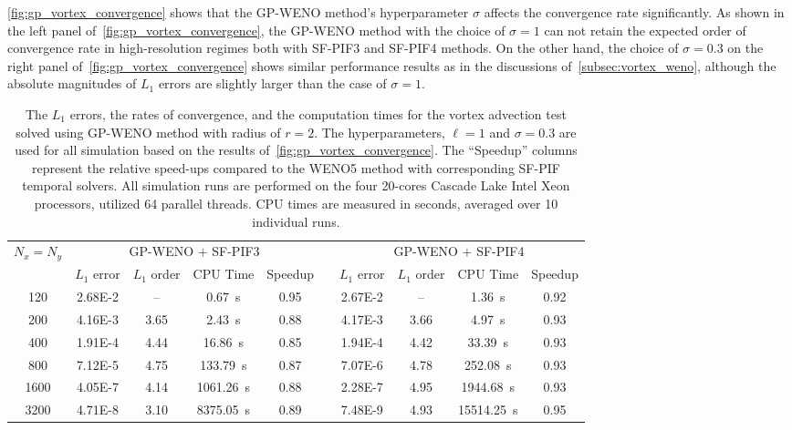 \cref{fig:gp_vortex_convergence} shows that the GP-WENO method's hyperparameter \( \sigma \)
affects the convergence rate significantly.
As shown in the left panel of~\cref{fig:gp_vortex_convergence},
the GP-WENO method with the choice of \( \sigma = 1 \) can not retain
the expected order of convergence rate
in high-resolution regimes
both with SF-PIF3 and SF-PIF4 methods.
On the other hand, the choice of \( \sigma = 0.3 \) on the right panel of~\cref{fig:gp_vortex_convergence}
shows similar performance results as in the discussions of~\cref{subsec:vortex_weno},
although the absolute magnitudes of \( L_{1} \) errors are slightly larger than
the case of \( \sigma = 1 \).

\begin{table}
    \centering
    \caption{The \( L_{1} \) errors, the rates of convergence,
        and the computation times for the vortex advection test
        solved using GP-WENO method with radius of \( r = 2 \).
        The hyperparameters, \( \ell = 1 \) and \( \sigma = 0.3 \)
        are used for all simulation based on the results of~\cref{fig:gp_vortex_convergence}.
        The ``Speedup'' columns represent the relative speed-ups
        compared to the WENO5 method with corresponding SF-PIF temporal solvers.
        All simulation runs are
        performed on the four 20-cores
        Cascade Lake Intel Xeon processors, utilized 64 parallel threads.
        CPU times are measured in seconds, averaged over 10 individual runs.
    }\label{table:vortex_gp2}
    \begin{adjustbox}{width=\textwidth}
        \begin{tabular}{@{}ccccclcccc@{}}
            \toprule
            \multirow{2}{*}{\( N_{x} = N_{y} \)} & \multicolumn{4}{c}{GP-WENO + SF-PIF3} &  & \multicolumn{4}{c}{GP-WENO + SF-PIF4} \\
            \cmidrule(lr){2-5} \cmidrule(l){7-10}
            & \(L_{1}\) error & \(L_{1}\) order & CPU Time & Speedup &  &
            \(L_{1}\) error & \(L_{1}\) order & CPU Time & Speedup \\ \midrule
            120  & \num{2.68E-2} & \--- & \SI{0.67}{\second}      & 0.95 &  & \num{2.67E-2} & \--- & \SI{1.36}{\second}     & 0.92 \\
            200  & \num{4.16E-3} & 3.65 & \SI{2.43}{\second}      & 0.88 &  & \num{4.17E-3} & 3.66 & \SI{4.97}{\second}     & 0.93 \\
            400  & \num{1.91E-4} & 4.44 & \SI{16.86}{\second}     & 0.85 &  & \num{1.94E-4} & 4.42 & \SI{33.39}{\second}    & 0.93 \\
            800  & \num{7.12E-5} & 4.75 & \SI{133.79}{\second}    & 0.87 &  & \num{7.07E-6} & 4.78 & \SI{252.08}{\second}   & 0.93 \\
            1600 & \num{4.05E-7} & 4.14 & \SI{1061.26}{\second}   & 0.88 &  & \num{2.28E-7} & 4.95 & \SI{1944.68}{\second}  & 0.93 \\
            3200 & \num{4.71E-8} & 3.10 & \SI{8375.05}{\second}   & 0.89 &  & \num{7.48E-9} & 4.93 & \SI{15514.25}{\second} & 0.95 \\
        \end{tabular}
    \end{adjustbox}
\end{table}

